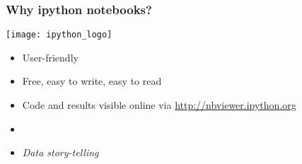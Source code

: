 
\begin{frame}[c]
\footnotesize
\frametitle{Why ipython notebooks?}

\texttt{[image: ipython\_logo]}

\vspace{1cm}

\begin{itemize}
\item User-friendly
\item Free, easy to write, easy to read
\item Code and results visible online via \url{http://nbviewer.ipython.org}
\item[]
\item<2-> \textit{Data story-telling}
\end{itemize}

\end{frame}


